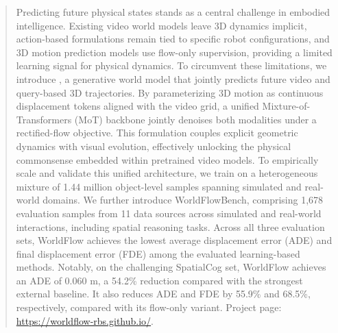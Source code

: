 \begin{abstract}
Predicting future physical states stands as a central challenge in embodied intelligence. Existing video world models leave 3D dynamics implicit, action-based formulations remain tied to specific robot configurations, and 3D motion prediction models use flow-only supervision, providing a limited learning signal for physical dynamics. To circumvent these limitations, we introduce \method{}, a generative world model that jointly predicts future video and query-based 3D trajectories. By parameterizing 3D motion as continuous displacement tokens aligned with the video grid, a unified Mixture-of-Transformers (MoT) backbone jointly denoises both modalities under a rectified-flow objective. This formulation couples explicit geometric dynamics with visual evolution, effectively unlocking the physical commonsense embedded within pretrained video models. To empirically scale and validate this unified architecture, we train \method{} on a heterogeneous mixture of 1.44 million object-level samples spanning simulated and real-world domains. We further introduce WorldFlowBench, comprising 1,678
evaluation samples from 11 data
sources across simulated and real-world interactions,
including spatial reasoning tasks. Across all three
evaluation sets, WorldFlow achieves the lowest average
displacement error (ADE) and final displacement error
(FDE) among the evaluated learning-based methods.
Notably, on the challenging SpatialCog set, WorldFlow achieves an ADE of 0.060 m, a 54.2\% reduction compared with the strongest external baseline. It also reduces ADE and FDE by 55.9\% and 68.5\%, respectively, compared with its flow-only variant. Project page: \url{https://worldflow-rbs.github.io/}.

\end{abstract}